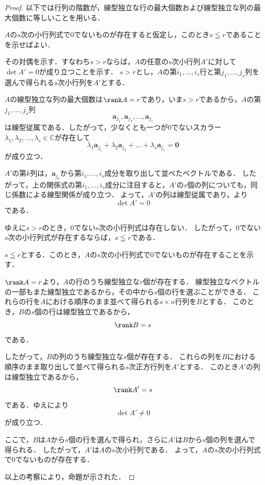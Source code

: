 \begin{tleftbar}
\begin{proof}
  以下では行列の階数が，線型独立な行の最大個数および線型独立な列の最大個数に等しいことを用いる．


  $A$の$s$次の小行列式で$0$でないものが存在すると仮定し，このとき$s \leqq r$であることを示せばよい．

  その対偶を示す．すなわち$s > r$ならば，$A$の任意の$s$次小行列$A'$に対して$\det A' = 0$が成り立つことを示す．
  $s > r$とし，$A$の第$i_1,\dots,i_s$行と第$j_1,\dots,j_s$列を選んで得られる$s$次小行列を$A'$とする．

  $A$の線型独立な列の最大個数は$\rank A = r$であり，いま$s > r$であるから，$A$の第$j_1,\dots,j_s$列
  \[
  \bm{a}_{j_1},\bm{a}_{j_2},\dots,\bm{a}_{j_s}
  \]
  は線型従属である．したがって，少なくとも一つが$0$でないスカラー$\lambda_1,\lambda_2,\dots,\lambda_s \in \mathbb{C}$が存在して
  \[
  \lambda_1 \bm{a}_{j_1} + \lambda_2 \bm{a}_{j_2} + \dots + \lambda_s \bm{a}_{j_s} = \bm{0}
  \]
  が成り立つ．

  $A'$の第$k$列は，$\bm{a}_{j_k}$から第$i_1,\dots,i_s$成分を取り出して並べたベクトルである．
  したがって，上の関係式の第$i_1,\dots,i_s$成分に注目すると，$A'$の$s$個の列についても，同じ係数による線型関係が成り立つ．
  よって，$A'$の列は線型従属であり，より
  \[
  \det A' = 0
  \]
  である．

  ゆえに$s > r$のとき，$0$でない$s$次の小行列式は存在しない．
  したがって，$0$でない$s$次の小行列式が存在するならば，$s \leqq r$である．


  $s \leqq r$とする．このとき，$A$の$s$次の小行列式で$0$でないものが存在することを示す．

  $\rank A = r$より，$A$の行のうち線型独立な$r$個が存在する．
  線型独立なベクトルの一部もまた線型独立であるから，その中から$s$個の行を選ぶことができる．
  これらの行を$A$における順序のまま並べて得られる$s \times n$行列を$B$とする．
  このとき，$B$の$s$個の行は線型独立であるから，
  \[
  \rank B = s
  \]
  である．

  したがって，$B$の列のうち線型独立な$s$個が存在する．
  これらの列を$B$における順序のまま取り出して並べて得られる$s$次正方行列を$A'$とする．
  このとき$A'$の列は線型独立であるから，
  \[
  \rank A' = s
  \]
  である．ゆえにより
  \[
  \det A' \ne 0
  \]
  が成り立つ．

  ここで，$B$は$A$から$s$個の行を選んで得られ，さらに$A'$は$B$から$s$個の列を選んで得られる．
  したがって，$A'$は$A$の$s$次小行列である．
  よって，$A$の$s$次の小行列式で$0$でないものが存在する．

  以上の考察により，命題が示された．
\end{proof}
\end{tleftbar}

